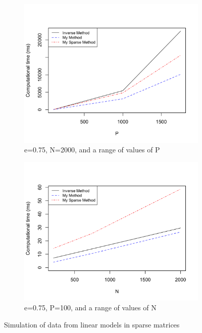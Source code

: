 \documentclass[11 pt]{article}
\begin{document}
\begin{enumerate}[label=(\Alph*)]
\begin{figure}[H]
\begin{center}
\begin{subfigure}[h]{0.45\linewidth}
	\includegraphics[width=\linewidth]{Ex01R/Fig/P1DPe075.png}
	\caption{e=0.75, N=2000, and a range of values of P}
	\end{subfigure}
		\begin{subfigure}[h]{0.45\linewidth}
	\includegraphics[width=\linewidth]{Ex01R/Fig/P1DNe075.png}
	\caption{e=0.75, P=100, and a range of values of N}
	\end{subfigure}
		\caption{Simulation of data from linear models in sparse matrices}
		\label{fig:Fig2}
	\end{center}
\end{figure}


\end{enumerate}
\newpage
\end{document}
